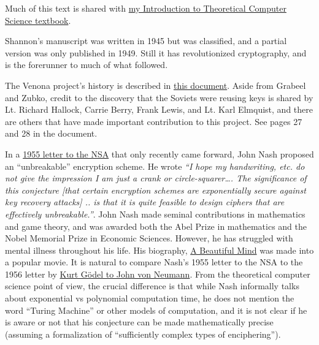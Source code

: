 Much of this text is shared with \href{https://introtcs.org}{my
Introduction to Theoretical Computer Science textbook}.

Shannon's manuscript was written in 1945 but was classified, and a
partial version was only published in 1949. Still it has revolutionized
cryptography, and is the forerunner to much of what followed.

The Venona project's history is described in
\href{http://nsarchive.gwu.edu/NSAEBB/NSAEBB278/01.PDF}{this document}.
Aside from Grabeel and Zubko, credit to the discovery that the Soviets
were reusing keys is shared by Lt. Richard Hallock, Carrie Berry, Frank
Lewis, and Lt. Karl Elmquist, and there are others that have made
important contribution to this project. See pages 27 and 28 in the
document.

In a
\href{https://www.nsa.gov/news-features/declassified-documents/nash-letters/assets/files/nash_letters1.pdf}{1955
letter to the NSA} that only recently came forward, John Nash proposed
an ``unbreakable'' encryption scheme. He wrote \emph{``I hope my
handwriting, etc. do not give the impression I am just a crank or
circle-squarer\ldots. The significance of this conjecture {[}that
certain encryption schemes are exponentially secure against key recovery
attacks{]} .. is that it is quite feasible to design ciphers that are
effectively unbreakable.''}. John Nash made seminal contributions in
mathematics and game theory, and was awarded both the Abel Prize in
mathematics and the Nobel Memorial Prize in Economic Sciences. However,
he has struggled with mental illness throughout his life. His biography,
\href{https://en.wikipedia.org/wiki/A_Beautiful_Mind_(book)}{A Beautiful
Mind} was made into a popular movie. It is natural to compare Nash's
1955 letter to the NSA to the 1956 letter by
\href{https://www.cs.cmu.edu/~aada/courses/15251s15/www/notes/godel-letter.pdf}{Kurt
Gödel to John von Neumann}. From the theoretical computer science point
of view, the crucial difference is that while Nash informally talks
about exponential vs polynomial computation time, he does not mention
the word ``Turing Machine'' or other models of computation, and it is
not clear if he is aware or not that his conjecture can be made
mathematically precise (assuming a formalization of ``sufficiently
complex types of enciphering'').
